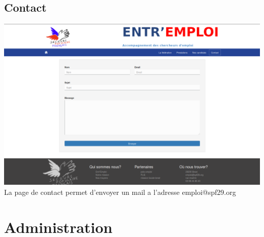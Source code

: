 \documentclass[a4paper, 12pt]{report}
\begin{document}
\section{Contact}
\includegraphics[width=16cm]{contact.png}
\\
La page de contact permet d'envoyer un mail a l'adresse emploi@spf29.org 

\chapter{Administration}
\end{document}

